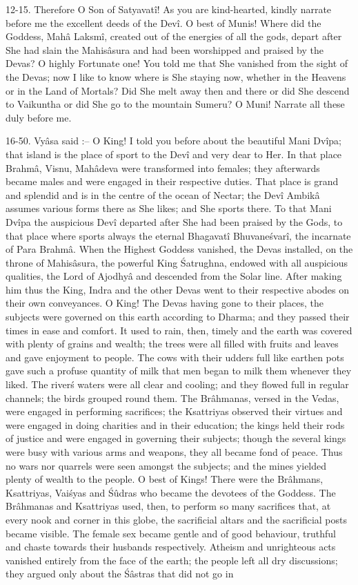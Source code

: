 12-15. Therefore O Son of Satyavat\^i! As you are kind-hearted, kindly narrate before me the excellent deeds of the Dev\^i. O best of Munis! Where did the Goddess, Mah\^a Laksm\^i, created out of the energies of all the gods, depart after She had slain the Mahis\^asura and had been worshipped and praised by the Devas? O highly Fortunate one! You told me that She vanished from the sight of the Devas; now I like to know where is She staying now, whether in the Heavens or in the Land of Mortals? Did She melt away then and there or did She descend to Vaikuntha or did She go to the mountain Sumeru? O Muni! Narrate all these duly before me.

16-50. Vy\^asa said :-- O King! I told you before about the beautiful Mani Dv\^ipa; that island is the place of sport to the Dev\^i and very dear to Her. In that place Brahm\^a, Visnu, Mah\^adeva were transformed into females; they afterwards became males and were engaged in their respective duties. That place is grand and splendid and is in the centre of the ocean of Nectar; the Dev\^i Ambik\^a assumes various forms there as She likes; and She sports there. To that Mani Dv\^ipa the auspicious Dev\^i departed after She had been praised by the Gods, to that place where sports always the eternal Bhagavat\^i Bhuvane\'svar\^i, the incarnate of Para Brahm\^a. When the Highest Goddess vanished, the Devas installed, on the throne of Mahis\^asura, the powerful King \'Satrughna, endowed with all auspicious qualities, the Lord of Ajodhy\^a and descended from the Solar line. After making him thus the King, Indra and the other Devas went to their respective abodes on their own conveyances. O King! The Devas having gone to their places, the subjects were governed on this earth according to Dharma; and they passed their times in ease and comfort. It used to rain, then, timely and the earth was covered with plenty of grains and wealth; the trees were all filled with fruits and leaves and gave enjoyment to people. The cows with their udders full like earthen pots gave such a profuse quantity of milk that men began to milk them whenever they liked. The river\'s waters were all clear and cooling; and they flowed full in regular channels; the birds grouped round them. The Br\^ahmanas, versed in the Vedas, were engaged in performing sacrifices; the Ksattriyas observed their virtues and were engaged in doing charities and in their education; the kings held their rods of justice and were engaged in governing their subjects; though the several kings were busy with various arms and weapons, they all became fond of peace. Thus no wars nor quarrels were seen amongst the subjects; and the mines yielded plenty of wealth to the people. O best of Kings! There were the Br\^ahmans, Ksattriyas, Vai\'syas and \'S\^udras who became the devotees of the Goddess. The Br\^ahmanas and Ksattriyas used, then, to perform so many sacrifices that, at every nook and corner in this globe, the sacrificial altars and the sacrificial posts became visible. The female sex became gentle and of good behaviour, truthful and chaste towards their husbands respectively. Atheism and unrighteous acts vanished entirely from the face of the earth; the people left all dry discussions; they argued only about the \'S\^astras that did not go in 